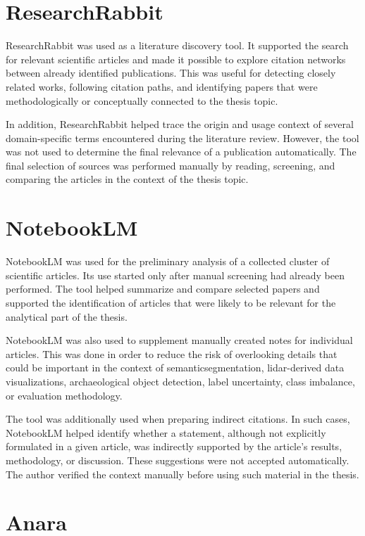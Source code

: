 \section{ResearchRabbit}

ResearchRabbit was used as a literature discovery tool. It supported the search for relevant scientific articles and made it possible to explore citation networks between already identified publications. This was useful for detecting closely related works, following citation paths, and identifying papers that were methodologically or conceptually connected to the thesis topic.

In addition, ResearchRabbit helped trace the origin and usage context of several domain-specific terms encountered during the literature review. However, the tool was not used to determine the final relevance of a publication automatically. The final selection of sources was performed manually by reading, screening, and comparing the articles in the context of the thesis topic.

\section{NotebookLM}

NotebookLM was used for the preliminary analysis of a collected cluster of scientific articles. Its use started only after manual screening had already been performed. The tool helped summarize and compare selected papers and supported the identification of articles that were likely to be relevant for the analytical part of the thesis.

NotebookLM was also used to supplement manually created notes for individual articles. This was done in order to reduce the risk of overlooking details that could be important in the context of \gls{semanticsegmentation}, \gls{lidar}-derived data visualizations, archaeological object detection, label uncertainty, class imbalance, or evaluation methodology.

The tool was additionally used when preparing indirect citations. In such cases, NotebookLM helped identify whether a statement, although not explicitly formulated in a given article, was indirectly supported by the article's results, methodology, or discussion. These suggestions were not accepted automatically. The author verified the context manually before using such material in the thesis.

\section{Anara}


